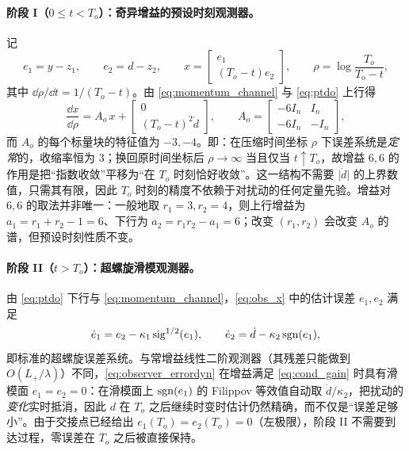 \paragraph{阶段 I（\(0\le t<T_o\)）：奇异增益的预设时刻观测器。}
记
\begin{equation}
e_1=y-z_1,\qquad e_2=d-z_2,\qquad
x=\begin{bmatrix}e_1\\ (T_o-t)e_2\end{bmatrix},\qquad
\rho=\log\frac{T_o}{T_o-t},
\label{eq:obs_x}
\end{equation}
其中 \(\dd\rho/\dd t=1/(T_o-t)\)。由 \eqref{eq:momentum_channel} 与 \eqref{eq:ptdo} 上行得
\begin{equation}
\frac{\dd x}{\dd\rho}=A_o\,x+\begin{bmatrix}0\\ (T_o-t)^{2}\dot d\end{bmatrix},
\qquad
A_o=\begin{bmatrix}-6I_n&I_n\\-6I_n&-I_n\end{bmatrix},
\label{eq:obs_rho_dyn}
\end{equation}
而 \(A_o\) 的每个标量块的特征值为 \(-3,-4\)。即：在压缩时间坐标 \(\rho\) 下误差系统是\emph{定常}的，收缩率恒为 \(3\)；换回原时间坐标后 \(\rho\to\infty\) 当且仅当 \(t\uparrow T_o\)，故增益 \(6,6\) 的作用是把“指数收敛”平移为“在 \(T_o\) 时刻恰好收敛”。这一结构不需要 \(\lvert\dot d\rvert\) 的上界数值，只需其有限，因此 \(T_o\) 时刻的精度不依赖于对扰动的任何定量先验。增益对 \(6,6\) 的取法并非唯一：一般地取 \(r_1=3,r_2=4\)，则上行增益为 \(a_1=r_1+r_2-1=6\)、下行为 \(a_2=r_1r_2-a_1=6\)；改变 \((r_1,r_2)\) 会改变 \(A_o\) 的谱，但预设时刻性质不变。

\paragraph{阶段 II（\(t>T_o\)）：超螺旋滑模观测器。}
由 \eqref{eq:ptdo} 下行与 \eqref{eq:momentum_channel}，\eqref{eq:obs_x} 中的估计误差 \(e_1,e_2\) 满足
\begin{equation}
\dot e_1=e_2-\kappa_1\operatorname{sig}^{1/2}(e_1),\qquad
\dot e_2=\dot d-\kappa_2\operatorname{sgn}(e_1),
\label{eq:observer_errordyn}
\end{equation}
即标准的超螺旋误差系统。与常增益线性二阶观测器（其残差只能做到 \(O(L_+/\lambda)\)）不同，\eqref{eq:observer_errordyn} 在增益满足 \eqref{eq:cond_gain} 时具有滑模面 \(e_1=e_2=0\)：在滑模面上 \(\operatorname{sgn}(e_1)\) 的 Filippov 等效值自动取 \(\dot d/\kappa_2\)，把扰动的\emph{变化}实时抵消，因此 \(d\) 在 \(T_o\) 之后继续时变时估计仍然精确，而不仅是“误差足够小”。由于交接点已经给出 \(e_1(T_o)=e_2(T_o)=0\)（左极限），阶段 II 不需要到达过程，零误差在 \(T_o\) 之后被直接保持。

